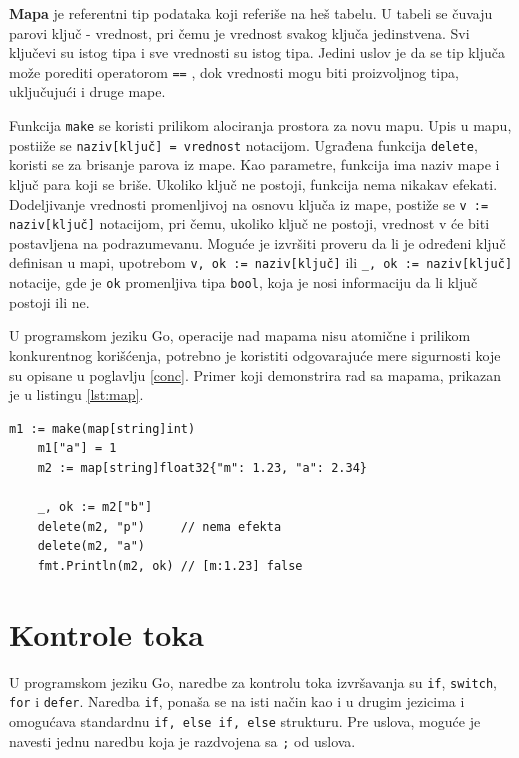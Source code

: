 \documentclass[12pt,oneside]{memoir}
\begin{document}
\textbf{Mapa} je referentni tip podataka koji referiše na heš tabelu. U tabeli se čuvaju parovi ključ - vrednost, pri čemu je vrednost svakog ključa jedinstvena. Svi ključevi su istog tipa i sve vrednosti su istog tipa. Jedini uslov je da se tip ključa može porediti operatorom \texttt{==} , dok vrednosti mogu biti proizvoljnog tipa, uključujući i druge mape. 

Funkcija \texttt{make} se koristi prilikom alociranja prostora za novu mapu. Upis u mapu, postiiže se \texttt{naziv[ključ] = vrednost} notacijom. Ugrađena funkcija \texttt{delete}, koristi se za brisanje parova iz mape. Kao parametre, funkcija ima naziv mape i ključ para koji se briše. Ukoliko ključ ne postoji, funkcija nema nikakav efekati. Dodeljivanje vrednosti promenljivoj na osnovu ključa iz mape, postiže se \texttt{v := naziv[ključ]} notacijom, pri čemu, ukoliko ključ ne postoji, vrednost v će biti postavljena na podrazumevanu. Moguće je izvršiti proveru da li je određeni ključ definisan u mapi, upotrebom \texttt{v, ok := naziv[ključ]} ili  \texttt{\_, ok := naziv[ključ]} notacije, gde je \texttt{ok} promenljiva tipa \texttt{bool}, koja je nosi informaciju da li ključ postoji ili ne. 

U programskom jeziku Go, operacije nad mapama nisu atomične i prilikom konkurentnog korišćenja, potrebno je koristiti odgovarajuće mere sigurnosti koje su opisane u poglavlju \ref{conc}. Primer koji demonstrira rad sa mapama, prikazan je u listingu \ref{lst:map}.

\begin{center}
\begin{lstlisting}[caption=Primer koji demonstrira rad sa mapama, label={lst:map},  backgroundcolor=\color{background}]
	m1 := make(map[string]int)
	m1["a"] = 1
	m2 := map[string]float32{"m": 1.23, "a": 2.34}
	
	_, ok := m2["b"]
	delete(m2, "p")		// nema efekta
	delete(m2, "a")
	fmt.Println(m2, ok) // [m:1.23] false
\end{lstlisting}
\end{center}

\section{Kontrole toka}

U programskom jeziku Go, naredbe za kontrolu toka izvršavanja su \texttt{if}, \texttt{switch}, \texttt{for} i \texttt{defer}. Naredba \texttt{if}, ponaša se na isti način kao i u drugim jezicima i omogućava standardnu \texttt{if, else if, else} strukturu. Pre uslova, moguće je navesti jednu naredbu koja je razdvojena sa \texttt{;} od uslova. 
\end{document}
